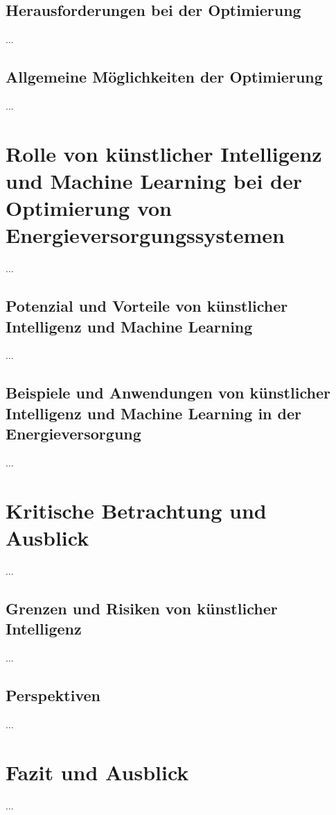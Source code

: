 \documentclass[
11pt, 
a4paper,
DIV = 14,
twoside,
twocolumn, %
parskip =half, %
headsepline, %
openright, %
]{scrreprt}
\begin{document}
	\section{Herausforderungen bei der Optimierung}
	...
	\section{Allgemeine Möglichkeiten der Optimierung}
	...
	

	\chapter{Rolle von künstlicher Intelligenz und Machine Learning bei der Optimierung von Energieversorgungssystemen}
	...
	\section{Potenzial und Vorteile von künstlicher Intelligenz und Machine Learning}
	...
	\section{Beispiele und Anwendungen von künstlicher Intelligenz und Machine Learning in der Energieversorgung}
	...


	\chapter{Kritische Betrachtung und Ausblick}
	...
	\section{Grenzen und Risiken von künstlicher Intelligenz}
	...
	\section{Perspektiven}
	...


	\chapter{Fazit und Ausblick}
	...
\end{document}
